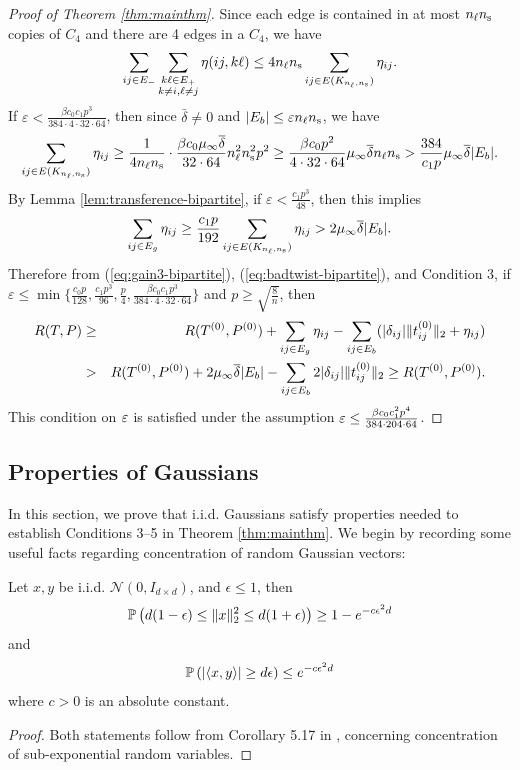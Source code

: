 \begin{proof}[Proof of Theorem \ref{thm:mainthm}]
Since each edge is contained in at most $\nl \ns$
copies of $C_{4}$ and there are 4 edges
in a $C_{4}$, we have 
\[
	\sum_{ij\in E_{-}}\sum_{\substack{k\ell\in E_{+}\\k\neq i, \ell \neq j}}\eta(ij,k\ell)
	\le 4 \nl \ns \sum_{ij\in E(\Knn)}\eta_{ij}.
\]
If $\varepsilon < \frac{\beta c_0 c_1 p^3}{384\cdot4\cdot32\cdot64}$, then since $\bar{\delta} \neq 0$ and $|\Eb| \leq \eps \nl \ns$, we have
\[
	\sum_{ij\in E(\Knn)}\eta_{ij}
	\ge\frac{1}{4 \nl \ns}\cdot\frac{\beta c_{0} \muinf \overline{\delta}}{32\cdot 64} \nl^2 \ns^2 p^2
	\ge\frac{\beta c_{0} p^2}{4 \cdot 32 \cdot 64}\muinf \overline{\delta} \nl \ns
	>\frac{384}{c_{1}p}\muinf\overline{\delta}|E_{b}|.
\]
By Lemma \ref{lem:transference-bipartite}, if $\varepsilon < \frac{c_1p^3}{48}$, then this implies 
\[
\sum_{ij\in E_{g}}\eta_{ij}\ge\frac{c_{1}p}{192}\sum_{ij\in E(\Knn)}\eta_{ij} > 2\muinf\overline{\delta}|E_{b}|.
\]
Therefore from (\ref{eq:gain3-bipartite}), (\ref{eq:badtwist-bipartite}), and Condition 3, 
if $\varepsilon \le \min\{\frac{c_0 p}{128}, \frac{c_1p^3}{96}, \frac{p}{4}, \frac{\beta c_0 c_1 p^3}{384\cdot4\cdot32\cdot64} \}$ and $p \geq \sqrt{\frac{8}{n}}$, then
\begin{eqnarray*}
R(T, P) & \ge & R(\Tnot, \Pnot)+\sum_{ij\in E_{g}}\eta_{ij}-\sum_{ij\in E_{b}}(|\delta_{ij}|\|t_{ij}^{(0)}\|_2+\eta_{ij})\\
 & > & R(\Tnot, \Pnot)+2\muinf\overline{\delta}|E_{b}|-\sum_{ij\in E_{b}}2|\delta_{ij}|\|t_{ij}^{(0)}\|_2\ge R(\Tnot, \Pnot).
\end{eqnarray*}
This condition on $\eps$ is satisfied under the assumption $\eps \leq \frac{\beta c_0 c_1^2 p^4}{384\cdot204\cdot64}$.
\end{proof}


\subsection{Properties of Gaussians} \label{sec-properties-of-gaussians}

In this section, we prove that i.i.d. Gaussians satisfy properties needed to establish Conditions 3--5 in Theorem \ref{thm:mainthm}. We begin by recording some useful facts regarding concentration of random Gaussian vectors:

\begin{lemma}
\label{lem:conc1}
Let $x,y$ be i.i.d. $\mathcal{N}(0,I_{d\times d})$, and $\epsilon \leq 1$, then
\[
\P\left ( d(1-\epsilon) \leq \|x\|_2^2 \leq d(1+\epsilon) \right) \geq 1- e^{-c \epsilon^2 d}
\]
and
\[
\P \left( |\langle x, y \rangle| \geq d\epsilon \right) \leq e^{-c\epsilon^2 d}
\]
where $c>0$ is an absolute constant.
\end{lemma}
\begin{proof}
Both statements follow from Corollary 5.17 in \cite{Vershynin}, concerning concentration of sub-exponential random variables.
\end{proof}

